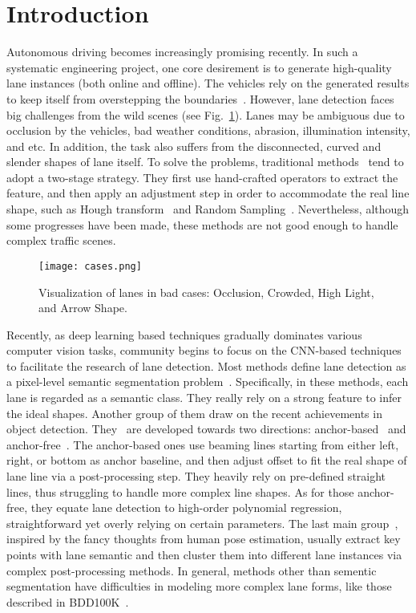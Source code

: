 \documentclass[preprint,12pt,review]{elsarticle}
\begin{document}
\section{Introduction}

\label{sec:intro}

Autonomous driving becomes increasingly promising recently. In such a systematic engineering project, one core desirement is to generate high-quality lane instances (both online and offline). The vehicles rely on the generated results to keep itself from overstepping the boundaries~\cite{lanekeeping}. However, lane detection faces big challenges from the wild scenes (see Fig.~\ref{fig:cases}). Lanes may be ambiguous due to occlusion by the vehicles, bad weather conditions, abrasion, illumination intensity, and etc. In addition, the task also suffers from the disconnected, curved and slender shapes of lane itself. To solve the problems, traditional methods~\cite{traditional1,traditional2,traditional3, traditional4,traditional5,traditional6,traditional7,traditional8} tend to adopt a two-stage strategy. They first use hand-crafted operators to extract the feature, and then apply an adjustment step in order to accommodate the real line shape, such as Hough transform~\cite{traditional1,traditional2} and Random Sampling~\cite{traditional4,traditional5}. Nevertheless, although some progresses have been made, these methods are not good enough to handle complex traffic scenes. 

\begin{figure}[tbp]
	\centering
	\texttt{[image: cases.png]}
	\caption{Visualization of lanes in bad cases: Occlusion, Crowded, High Light, and Arrow Shape.}
	\label{fig:cases}
\end{figure}
Recently, as deep learning based techniques gradually dominates various computer vision tasks, community begins to focus on the CNN-based techniques to facilitate the research of lane detection. Most methods define lane detection as a pixel-level semantic segmentation problem~\cite{rbnet, erfnet, liulane, SCNN, distillation, vanishing, gan, resa}. Specifically, in these methods, each lane is regarded as a semantic class. They really rely on a strong feature to infer the ideal shapes. Another group of them draw on the recent achievements in object detection. They~\cite{linecnn,laneatt,polylanenet,lstr} are developed towards two directions: anchor-based~\cite{linecnn,laneatt} and anchor-free~\cite{polylanenet,lstr}. The anchor-based ones use beaming lines starting from either left, right, or bottom as anchor baseline, and then adjust offset to fit the real shape of lane line via a post-processing step. They heavily rely on pre-defined straight lines, thus struggling to handle more complex line shapes. As for those anchor-free, they equate lane detection to high-order polynomial regression, straightforward yet overly relying on certain parameters. The last main group~\cite{key1,PINet,laneaf,curvelane}, inspired by the fancy thoughts from human pose estimation, usually extract key points with lane semantic and then cluster them into different lane instances via complex post-processing methods. In general, methods other than sementic segmentation have difficulties in modeling more complex lane forms, like those described in BDD100K~\cite{bdd}. 
\end{document}
